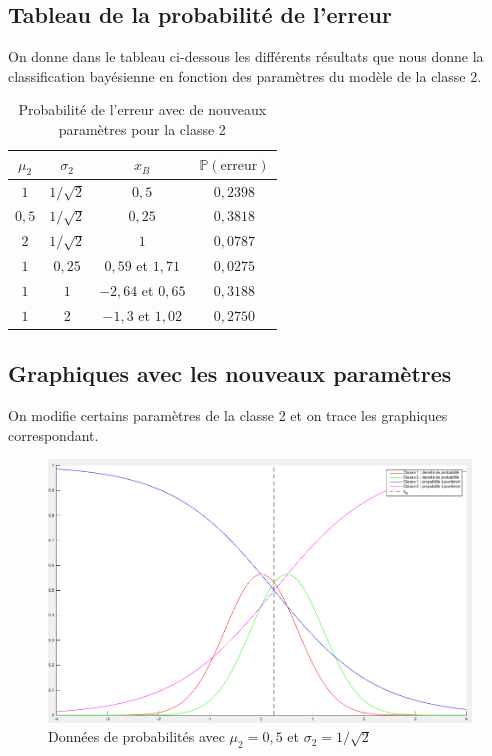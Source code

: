 \documentclass[11pt,a4paper]{article}
\begin{document}
\subsection{Tableau de la probabilité de l'erreur}

On donne dans le tableau ci-dessous les différents résultats que nous donne la classification bayésienne en fonction des paramètres du modèle de la classe 2.
\begin{table}[H]
\center
\begin{tabular}{|c|c|c|c|}
\hline 
$\mu_2$ & $\sigma_2$ & $x_B$ & $\mathbb{P}(\text{erreur})$ \\ 
\hline 
$1$ & $1/ \sqrt{2}$ & $0,5$ & $0,2398$ \\ 
\hline 
$0,5$ & $1/ \sqrt{2}$ & $0,25$ & $0,3818$ \\ 
\hline 
$2$ & $1/ \sqrt{2}$ & $1$ & $0,0787$ \\ 
\hline 
$1$ & $0,25$ & $0,59$ et $1,71$ & $0,0275$ \\ 
\hline 
$1$ & $1$ & $-2,64$ et $0,65$ & $0,3188$ \\ 
\hline 
$1$ & $2$ & $-1,3$ et $1,02$ & $0,2750$ \\ 
\hline 
\end{tabular}
\caption{Probabilité de l'erreur avec de nouveaux paramètres pour la classe 2}

\end{table}


\subsection{Graphiques avec les nouveaux paramètres}
On modifie certains paramètres de la classe 2 et on trace les graphiques correspondant.

\begin{figure}[H]
\center
\includegraphics[width=14cm]{exo1_graph_mu05.png}
\caption{Données de probabilités avec $\mu_2 = 0,5$ et $\sigma_2 = 1/\sqrt{2}$}
\end{figure}
\end{document}
